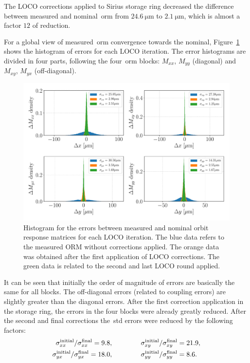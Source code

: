 The LOCO corrections applied to Sirius storage ring decreased the difference between measured and nominal~\gls{orm} from $\SI{24.6}{\micro\meter}$ to $\SI{2.1}{\micro\meter}$, which is almost a factor $12$ of reduction.

For a global view of measured~\gls{orm} convergence towards the nominal, Figure~\ref{fig:histogram} shows the histogram of errors for each LOCO iteration. The error histograms are divided in four parts, following the four~\gls{orm} blocks: $M_{xx}$, $M_{yy}$ (diagonal) and $M_{xy}$, $M_{yx}$ (off-diagonal). 
\begin{figure}
\centering
\includegraphics[width=1.0\textwidth]{figures/histogram_loco_iterations3_density.pdf}
\caption{Histogram for the errors between measured and nominal orbit response matrices for each LOCO iteration. The blue data refers to the measured ORM without corrections applied. The orange data was obtained after the first application of LOCO corrections. The green data is related to the second and last LOCO round applied.}
\label{fig:histogram}
\end{figure}

It can be seen that initially the order of magnitude of errors are basically the same for all blocks. The off-diagonal errors (related to coupling errors) are slightly greater than the diagonal errors. After the first correction application in the storage ring, the errors in the four blocks were already greatly reduced. After the second and final corrections the~\gls{std} errors were reduced by the following factors: 
\begin{align*}
    \sigma_{xx}^{\mathrm{initial}}/\sigma_{xx}^{\mathrm{final}} = 9.8, & \hspace{1.5cm} \sigma_{xy}^{\mathrm{initial}}/\sigma_{xy}^{\mathrm{final}} = 21.9, \\
    \sigma_{yx}^{\mathrm{initial}}/\sigma_{yx}^{\mathrm{final}} = 18.0, & \hspace{1.5cm}
    \sigma_{yy}^{\mathrm{initial}}/\sigma_{yy}^{\mathrm{final}} = 8.6. 
\end{align*}

